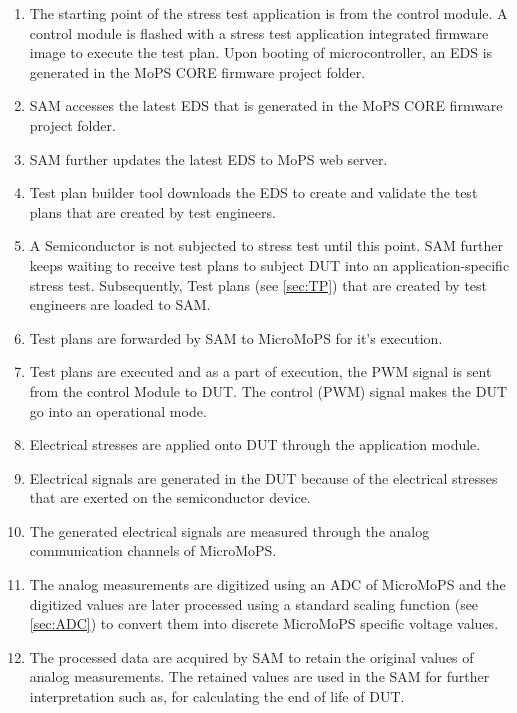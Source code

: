 \begin{enumerate}
\item The starting point of the stress test application is from the control module. A control module is flashed with a stress test application integrated firmware image to execute the test plan. Upon booting of microcontroller, an \acrshort{EDS} is generated in the MoPS CORE firmware project folder.
\item SAM accesses the latest \acrshort{EDS} that is generated in the MoPS CORE firmware project folder.
\item SAM further updates the latest EDS to MoPS web server.
\item Test plan builder tool downloads the EDS to create and validate the test plans that are created by test engineers.
\item A Semiconductor is not subjected to stress test until this point. SAM further keeps waiting to receive test plans to subject DUT into an application-specific stress test.
 Subsequently, Test plans (see \cref{sec:TP}) that are created by test engineers are loaded to SAM.
\item Test plans are forwarded by SAM to MicroMoPS for it's execution.
\item Test plans are executed and as a part of execution, the PWM signal is sent from the control Module to \acrshort{DUT}. 
The control (PWM) signal makes the DUT go into an operational mode.
\item Electrical stresses are applied onto DUT through the application module.
\item Electrical signals are generated in the DUT because of the electrical stresses that are exerted on the semiconductor device.
\item The generated electrical signals are measured through the analog communication channels of MicroMoPS.
\item The analog measurements are digitized using an ADC of MicroMoPS and the digitized values are later processed using a standard scaling function (see \cref{sec:ADC}) to convert them into discrete MicroMoPS specific voltage values.
\item The processed data are acquired by SAM to retain the original values of analog measurements. The retained values are used in the SAM for further interpretation such as, for calculating the end of life of DUT. 
\end{enumerate}     
